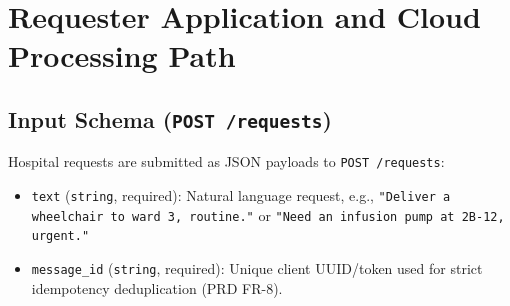 \documentclass[10pt,letterpaper]{article}
\begin{document}
\section{Requester Application and Cloud Processing Path}

\subsection{Input Schema (\texttt{POST /requests})}
Hospital requests are submitted as JSON payloads to \texttt{POST /requests}:
\begin{itemize}
  \item \texttt{text} (\texttt{string}, required): Natural language request, e.g., \texttt{"Deliver a wheelchair to ward 3, routine."} or \texttt{"Need an infusion pump at 2B-12, urgent."}
  \item \texttt{message\_id} (\texttt{string}, required): Unique client UUID/token used for strict idempotency deduplication (PRD FR-8).
\end{itemize}
\end{document}
